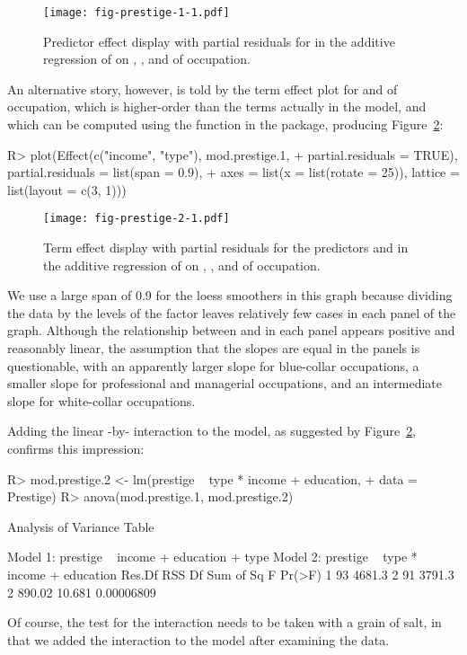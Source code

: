 \documentclass[article]{jss}
\begin{document}
\begin{figure}[t!]
  \centering
    \texttt{[image: fig-prestige-1-1.pdf]}
    \caption{Predictor effect display with partial residuals for
       in the additive regression of  on
      , , and  of
      occupation.}\label{fig-prestige-1}
\end{figure}

An alternative story, however, is told by the term effect plot for
 and  of occupation, which is higher-order
than the terms actually in the model, and which can be computed using
the  function in the  package, producing
Figure~\ref{fig-prestige-2}:
%
\begin{Schunk}
\begin{Sinput}
R> plot(Effect(c("income", "type"), mod.prestige.1,
+    partial.residuals = TRUE), partial.residuals = list(span = 0.9),
+    axes = list(x = list(rotate = 25)), lattice = list(layout = c(3, 1)))
\end{Sinput}
\end{Schunk}
%
\begin{figure}[t!]
  \centering
    \texttt{[image: fig-prestige-2-1.pdf]}
  \caption{Term effect display with partial residuals for the
    predictors  and  in the additive
    regression of  on , ,
    and  of occupation.}\label{fig-prestige-2}
\end{figure}
We use a large span of 0.9 for the loess smoothers in this graph
because dividing the data by the levels of the factor 
leaves relatively few cases in each panel of the graph. Although the
relationship between  and  in each panel
appears positive and reasonably linear, the assumption that the slopes
are equal in the panels is questionable, with an apparently larger
slope for blue-collar occupations, a smaller slope for professional
and managerial occupations, and an intermediate slope for white-collar
occupations.

Adding the linear -by- interaction to the
model, as suggested by Figure~\ref{fig-prestige-2}, confirms this
impression:
%
\begin{Schunk}
\begin{Sinput}
R> mod.prestige.2 <- lm(prestige ~ type * income + education,
+    data = Prestige)
R> anova(mod.prestige.1, mod.prestige.2)
\end{Sinput}
\begin{Soutput}
Analysis of Variance Table

Model 1: prestige ~ income + education + type
Model 2: prestige ~ type * income + education
  Res.Df    RSS Df Sum of Sq      F     Pr(>F)
1     93 4681.3                               
2     91 3791.3  2    890.02 10.681 0.00006809
\end{Soutput}
\end{Schunk}
%
Of course, the test for the interaction needs to be taken with a grain
of salt, in that we added the interaction to the model after examining
the data.
\end{document}
